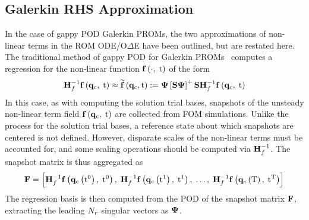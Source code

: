 \subsection{Galerkin RHS Approximation}
%
In the case of gappy POD Galerkin PROMs, the two approximations of non-linear terms in the ROM ODE/O$\Delta$E have been outlined, but are restated here. The traditional method of gappy POD for Galerkin PROMs~\cite{Chaturantabut2010} computes a regression for the non-linear function $\mathbf{f} \left(\cdot, \; \text{t}\right)$ of the form
%
\begin{equation}
	\rhsScaleInv \rhsFunc{\consVec, \; \timeVar} \approx \rhsApproxFunc{\consVec, \timeVar} \defEq \deimBasis \left[\sampMat \deimBasis \right]^+ \sampMat \rhsScaleInv \rhsFunc{\consVec, \; \timeVar}
\end{equation}
%
In this case, as with computing the solution trial bases, snapshots of the unsteady non-linear term field $\mathbf{f} \left(\mathbf{q}_{c}, \; \text{t}\right)$ are collected from FOM simulations. Unlike the process for the solution trial bases, a reference state about which snapshots are centered is not defined. However, disparate scales of the non-linear terms must be accounted for, and some scaling operations should be computed via $\rhsScaleInv$. The snapshot matrix is thus aggregated as
%
\begin{equation}
	\rhsDataMat = \left[ \rhsScaleInv \rhsFunc{\consFunc{\timeVar^0}, \; \timeVar^0}, \; \rhsScaleInv \rhsFunc{\consFunc{\timeVar^1}, \; \timeVar^1}, \; \hdots, \; \rhsScaleInv \rhsFunc{\consFunc{\finalTime}, \; \timeVar^{\finalTime}} \right]
\end{equation}
%
The regression basis is then computed from the POD of the snapshot matrix $\rhsDataMat$, extracting the leading $N_r$ singular vectors as $\deimBasis$.

